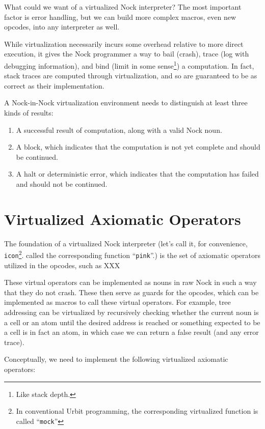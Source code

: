 What could we want of a virtualized Nock interpreter?  The most important factor is error handling, but we can build more complex macros, even new opcodes, into any interpreter as well.

While virtualization necessarily incurs some overhead relative to more direct execution, it gives the Nock programmer a way to bail (crash), trace (log with debugging information), and bind (limit in some sense\footnote{Like stack depth.}) a computation. In fact, stack traces are computed through virtualization, and so are guaranteed to be as correct as their implementation.

A Nock-in-Nock virtualization environment needs to distinguish at least three kinds of results:
\begin{enumerate}
  \item A successful result of computation, along with a valid Nock noun.
  \item A block, which indicates that the computation is not yet complete and should be continued.
  \item A halt or deterministic error, which indicates that the computation has failed and should not be continued.
\end{enumerate}

\section{Virtualized Axiomatic Operators}

The foundation of a virtualized Nock interpreter (let's call it, for convenience, \lstinline[style=inlinecode]{icon}\footnote{In conventional Urbit programming, the corresponding virtualized function is called ``\lstinline[style=inlinecode]{mock}''}.  \citet{lacnes2025} called the corresponding function ``\lstinline[style=inlinecode]{pink}''.) is the set of axiomatic operators utilized in the opcodes, such as XXX

These virtual operators can be implemented as nouns in raw Nock in such a way that they do not crash.  These then serve as guards for the opcodes, which can be implemented as macros to call these virtual operators.  For example, tree addressing can be virtualized by recursively checking whether the current noun is a cell or an atom until the desired address is reached or something expected to be a cell is in fact an atom, in which case we can return a false result (and any error trace).

Conceptually, we need to implement the following virtualized axiomatic operators:


